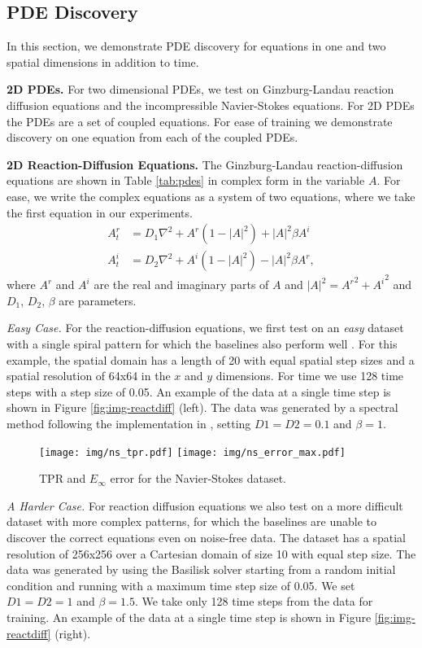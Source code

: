 \subsection{PDE Discovery}
In this section, we demonstrate PDE discovery for equations in one and two spatial dimensions in addition to time.



\textbf{2D PDEs.} For two dimensional PDEs, we test on Ginzburg-Landau reaction diffusion equations and the incompressible Navier-Stokes equations.
For 2D PDEs the PDEs are a set of coupled equations.
For ease of training we demonstrate discovery on one equation from each of the coupled PDEs.

\begingroup
\setlength\abovedisplayskip{1.5pt}
\setlength\belowdisplayskip{1.5pt}
\textbf{2D Reaction-Diffusion Equations.} The Ginzburg-Landau reaction-diffusion equations are shown in Table \ref{tab:pdes} in complex form in the variable $A$.
For ease, we write the complex equations as a system of two equations, where we take the first equation in our experiments.
\begin{align}
A^r_t &= D_1\nabla^2 + A^r(1-|A|^2) + |A|^2 \beta A^i\\
A^i_t &= D_2\nabla^2 + A^i(1-|A|^2) - |A|^2 \beta A^r,
\end{align}
where $A^r$ and $A^i$ are the real and imaginary parts of $A$ and $|A|^2 = {A^r}^2 + {A^i}^2$ and $D_1$, $D_2$, $\beta$ are parameters.

\emph{Easy Case.} For the reaction-diffusion equations, we first test on an \emph{easy} dataset with a single spiral pattern for which the baselines also perform well \cite{reinbold2020using}. 
For this example, the spatial domain has a length of 20 with equal spatial step sizes and a spatial resolution of 64x64 in the $x$ and $y$ dimensions.
For time we use 128 time steps with a step size of 0.05.
An example of the data at a single time step is shown in Figure \ref{fig:img-reactdiff} (left).
The data was generated by a spectral method following the implementation in \citet{de2020pysindy}, setting $D1=D2=0.1$  and $\beta=1$.
\endgroup
\begin{figure}[t]
    \texttt{[image: img/ns\_tpr.pdf]}
    \texttt{[image: img/ns\_error\_max.pdf]}
  \vskip -0.1in
  \caption{TPR and $E_\infty$ error for the Navier-Stokes dataset.}
  \vskip -0.2in
  \label{fig:ns-plots}
\end{figure}


\emph{A Harder Case.} For reaction diffusion equations we also test on a more difficult dataset with more complex patterns, for which the baselines are unable to discover the correct equations even on noise-free data.
The dataset has a spatial resolution of 256x256 over a Cartesian domain of size 10 with equal step size.
The data was generated by using the Basilisk solver \cite{kenneally2020basilisk} starting from a random initial condition and running with a maximum time step size of 0.05. 
We set $D1=D2=1$  and $\beta=1.5$.
We take only 128 time steps from the data for training.
An example of the data at a single time step is shown in Figure \ref{fig:img-reactdiff} (right).

